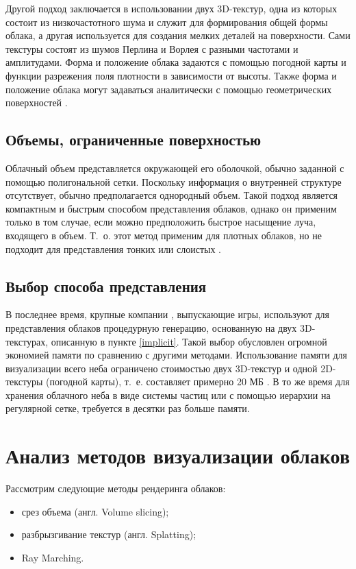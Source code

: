 Другой подход заключается в использовании двух 3D-текстур, одна из которых состоит из низкочастотного шума и служит для формирования общей формы облака, а другая используется для создания мелких деталей на поверхности. Сами текстуры состоят из шумов Перлина и Ворлея с разными частотами и амплитудами. Форма и положение облака задаются с помощью погодной карты и функции разрежения поля плотности в зависимости от высоты. Также форма и положение облака могут задаваться аналитически с помощью геометрических поверхностей \cite{frostbite, hzd}.

\subsection{Объемы, ограниченные поверхностью} 
Облачный объем представляется окружающей его оболочкой, обычно заданной с помощью полигональной сетки. Поскольку информация о внутренней структуре отсутствует, обычно предполагается однородный объем. Такой подход является компактным и быстрым способом представления облаков, однако он применим только в том случае, если можно предположить быстрое насыщение луча, входящего в объем. Т.~о. этот метод применим для плотных облаков, но не подходит для представления тонких или слоистых \cite{clouds}. 

\subsection{Выбор способа представления}

В последнее время, крупные компании \cite{frostbite, hzd}, выпускающие игры, используют для представления облаков процедурную генерацию, основанную на двух 3D-текстурах, описанную в пункте \ref{implicit}. Такой выбор обусловлен огромной экономией памяти по сравнению с другими методами. Использование памяти для визуализации всего неба ограничено стоимостью двух 3D-текстур и одной 2D-текстуры (погодной карты), т.~е. составляет примерно 20 МБ \cite{hzdres}. В то же время для хранения облачного неба в виде системы частиц или с помощью иерархии на регулярной сетке, требуется в десятки раз больше памяти.

 
\section{Анализ методов визуализации облаков}

Рассмотрим следующие методы рендеринга облаков:

\begin{itemize}
	\item срез объема (англ. Volume slicing);
	\item разбрызгивание текстур (англ. Splatting);
	\item Ray Marching.
\end{itemize}


